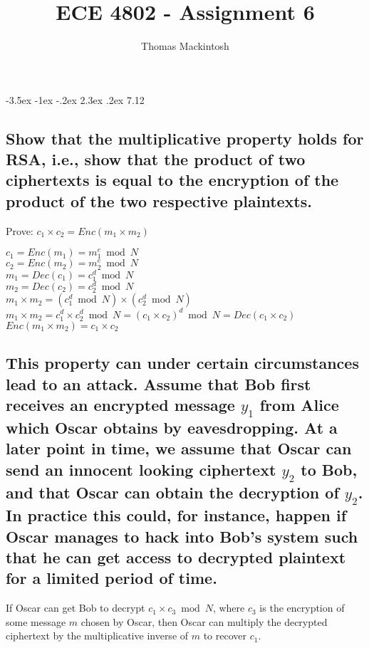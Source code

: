 \documentclass{article}
\makeatletter
\renewcommand\section{\@startsection{section}{1}{\z@}%
                                   {-3.5ex \@plus -1ex \@minus -.2ex}%
                                   {2.3ex \@plus.2ex}%
                                   {\normalfont\large\bfseries}}
\makeatother
\begin{document}
	\title{ECE 4802 - Assignment 6}
	\author{Thomas Mackintosh}
	\maketitle
	
	\section{7.12}
		\subsection{Show that the multiplicative property holds for RSA, i.e., show that the 		product of 		two ciphertexts is equal to the encryption of the product of the two 			respective plaintexts.}
			Prove: $c_1 \times c_2 = Enc(m_1 \times m_2)$\\
			\begin{center}
				$c_1 = Enc(m_1) = m_1^e \bmod N$\\
				$c_2 = Enc(m_2) = m_2^e \bmod N$\\
				$m_1 = Dec(c_1) = c_1^d \bmod N$\\
				$m_2 = Dec(c_2) = c_2^d \bmod N$\\
				$m_1 \times m_2 = (c_1^d \bmod N) \times (c_2^d \bmod N)$\\
				$m_1 \times m_2 = c_1^d \times c_2^d \bmod N = (c_1\times c_2)^d \bmod N = Dec(c_1 					\times c_2)$\\
				$Enc(m_1 \times m_2) = c_1 \times c_2$
			\end{center}
		\subsection{This property can under certain circumstances lead to an attack. Assume that Bob first 			receives an encrypted message $y_1$ from Alice which Oscar obtains by eavesdropping. At a later 			point in time, we assume that Oscar can send an innocent looking ciphertext $y_2$ to Bob, and that 			Oscar can obtain the decryption of $y_2$. In practice this could, for instance, happen if Oscar manages 		to hack into Bob's system such that he can get access to decrypted plaintext for a limited period of 			time.}
		If Oscar can get Bob to decrypt $c_1 \times c_3 \bmod N$, where $c_3$ is the encryption of some 			message $m$ chosen by Oscar, then Oscar can multiply the decrypted ciphertext by the multiplicative 		inverse of $m$ to recover $c_1$.
		
\end{document}
